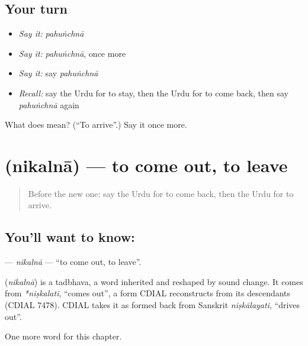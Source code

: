 \subsection*{Your turn}
\begin{itemize}
\raggedright
  \item \emph{Say it:} \emph{pahuṅchnā}
  \item \emph{Say it:} \emph{pahuṅchnā}, once more
  \item \emph{Say it:} say \emph{pahuṅchnā}
  \item \emph{Recall:} say the Urdu for to stay, then the Urdu for to come back, then say \emph{pahuṅchnā} again
\end{itemize}

\begin{tcolorbox}[breakable,colback=teal!4,colframe=teal!35!black,title={Before you move on}]
What does  mean? (\textquotedblleft{}To arrive\textquotedblright{}.) Say it once more.
\end{tcolorbox}
\section[\texorpdfstring{\ur{نکلنا} (nikalnā)}{نکلنا (nikalnā)}]{ (nikalnā) — to come out, to leave}

\label{lesson:UR-C141-nikalna}



\begin{quote}
Before the new one: say the Urdu for to come back, then the Urdu for to arrive.
\end{quote}

\subsection*{You'll want to know: }
\textbf{} — \emph{nikalnā} — \textquotedblleft{}to come out, to leave\textquotedblright{}.

\begin{cousinweb}
\textbf{} (\emph{nikalnā}) is a tadbhava, a word inherited and reshaped by sound change. It comes from \emph{*niṣkalati}, \textquotedblleft{}comes out\textquotedblright{}, a form CDIAL reconstructs from its descendants (CDIAL 7478). CDIAL takes it as formed back from Sanskrit \emph{niṣkālayati}, \textquotedblleft{}drives out\textquotedblright{}.
\end{cousinweb}

\begin{grammarlens}[title={What you've built}]
One more word for this chapter.
\end{grammarlens}

